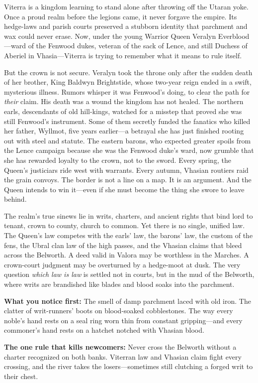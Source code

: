 \vspace{2mm}
\begin{tcolorbox}[colback=black!3,colframe=blue!60!black,title={Theme \& Atmosphere},breakable]
Viterra is a kingdom learning to stand alone after throwing off the Utaran yoke. Once a proud realm before the legions came, it never forgave the empire. Its hedge-laws and parish courts preserved a stubborn identity that parchment and wax could never erase. Now, under the young Warrior Queen Veralyn Everblood---ward of the Fenwood dukes, veteran of the sack of Lence, and still Duchess of Aberiel in Vhasia---Viterra is trying to remember what it means to rule itself.

But the crown is not secure. Veralyn took the throne only after the sudden death of her brother, King Baldwyn Brightstide, whose two-year reign ended in a swift, mysterious illness. Rumors whisper it was Fenwood's doing, to clear the path for \emph{their} claim. His death was a wound the kingdom has not healed. The northern earls, descendants of old hill-kings, watched for a misstep that proved she was still Fenwood's instrument. Some of them secretly funded the fanatics who killed her father, Wyllmot, five years earlier---a betrayal she has just finished rooting out with steel and statute. The eastern barons, who expected greater spoils from the Lence campaign because she was the Fenwood duke's ward, now grumble that she has rewarded loyalty to the crown, not to the sword. Every spring, the Queen's justiciars ride west with warrants. Every autumn, Vhasian routiers raid the grain convoys. The border is not a line on a map. It is an argument. And the Queen intends to win it---even if she must become the thing she swore to leave behind.

The realm's true sinews lie in writs, charters, and ancient rights that bind lord to tenant, crown to county, church to common. Yet there is no single, unified law. The Queen's law competes with the earls' law, the barons' law, the custom of the fens, the Ubral clan law of the high passes, and the Vhasian claims that bleed across the Belworth. A deed valid in Valora may be worthless in the Marches. A crown-court judgment may be overturned by a hedge-moot at dusk. The very question \emph{which law is law} is settled not in courts, but in the mud of the Belworth, where writs are brandished like blades and blood soaks into the parchment.

\vspace{2mm}
\textbf{What you notice first:} The smell of damp parchment laced with old iron. The clatter of writ-runners' boots on blood-soaked cobblestones. The way every noble's hand rests on a seal ring worn thin from constant gripping---and every commoner's hand rests on a hatchet notched with Vhasian blood.

\textbf{The one rule that kills newcomers:} Never cross the Belworth without a charter recognized on both banks. Viterran law and Vhasian claim fight every crossing, and the river takes the losers---sometimes still clutching a forged writ to their chest.
\end{tcolorbox}

